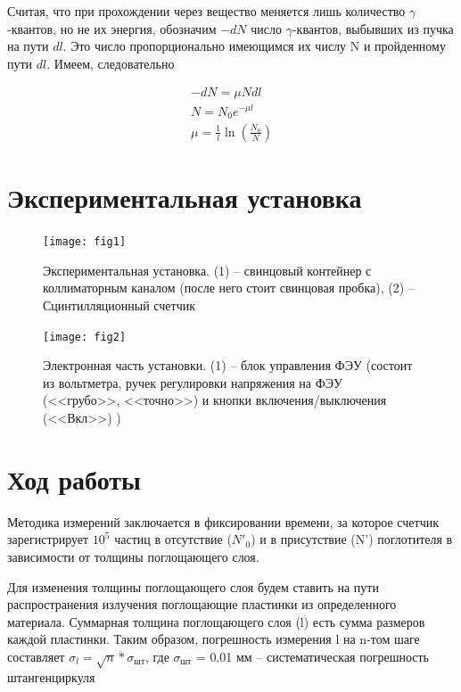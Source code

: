 \documentclass[a4paper,12pt]{article}
\begin{document}
Считая, что при прохождении через вещество меняется лишь количество $\gamma$-квантов, но не их энергия, обозначим $-dN$ число $\gamma$-квантов, выбывших из пучка на пути $dl$. Это число пропорционально имеющимся их числу N и пройденному пути $dl$. Имеем, следовательно

\begin{align}
	-dN = \mu N dl \nonumber \\
	N = N_0 e^{-\mu l} \nonumber \\
	\mu = \frac{1}{l} \ln \left( \frac{N_0}{N} \right) \label{eq1}
\end{align}


\section*{Экспериментальная установка}

\begin{figure}[h]
	\texttt{[image: fig1]}
	\caption{Экспериментальная установка. (1) -- свинцовый контейнер с коллиматорным каналом (после него стоит свинцовая пробка), (2) -- Сцинтилляционный счетчик}
	 \label{fig:setup1}
\end{figure}


\pagebreak

\begin{figure}[h]
	\texttt{[image: fig2]}
	\caption{Электронная часть установки. (1) -- блок управления ФЭУ (состоит из вольтметра, ручек регулировки напряжения на ФЭУ (<<грубо>>, <<точно>>) и кнопки включения/выключения (<<Вкл>>) ) }
	\label{fig:setup2}
\end{figure}

\section*{Ход работы}

Методика измерений заключается в фиксировании времени, за которое счетчик зарегистрирует $10^5$ частиц в отсутствие ($N'_0$) и в присутствие (N') поглотителя в зависимости от толщины поглощающего слоя.

Для изменения толщины поглощающего слоя будем ставить на пути распространения излучения поглощающие пластинки из определенного материала. Суммарная толщина поглощающего слоя (l) есть сумма размеров каждой пластинки. Таким образом, погрешность измерения l на n-том шаге составляет $\sigma_l = \sqrt{n} * \sigma_{шт}$, где $\sigma_{шт}$ = 0.01 мм -- систематическая погрешность штангенциркуля
\end{document}
